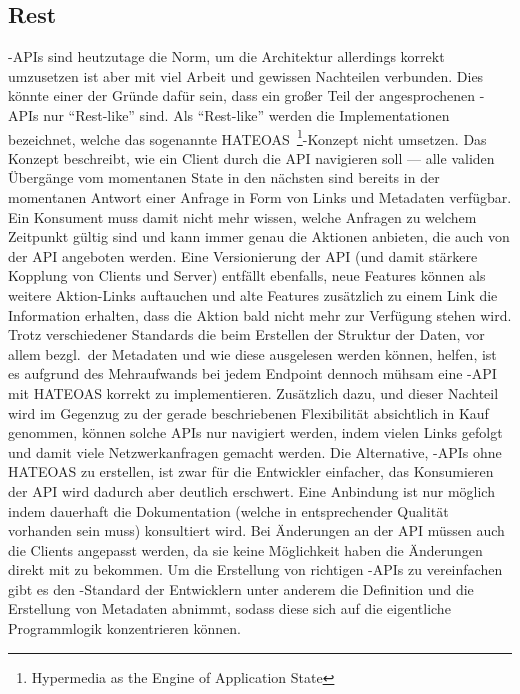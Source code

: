\subsection{Rest}
-APIs sind heutzutage die Norm, um die Architektur allerdings korrekt umzusetzen ist aber mit viel Arbeit und gewissen Nachteilen verbunden. Dies könnte einer der Gründe dafür sein, dass ein großer Teil der angesprochenen -APIs nur ``Rest-like'' sind. Als ``Rest-like'' werden die Implementationen bezeichnet, welche das sogenannte HATEOAS~\footnote{Hypermedia as the Engine of Application State}-Konzept nicht umsetzen. Das Konzept beschreibt, wie ein Client durch die API navigieren soll --- alle validen Übergänge vom momentanen State in den nächsten sind bereits in der momentanen Antwort einer Anfrage in Form von Links und Metadaten verfügbar. Ein Konsument muss damit nicht mehr wissen, welche Anfragen zu welchem Zeitpunkt gültig sind und kann immer genau die Aktionen anbieten, die auch von der API angeboten werden. Eine Versionierung der API (und damit stärkere Kopplung von Clients und Server) entfällt ebenfalls, neue Features können als weitere Aktion-Links auftauchen und alte Features zusätzlich zu einem Link die Information erhalten, dass die Aktion bald nicht mehr zur Verfügung stehen wird. Trotz verschiedener Standards die beim Erstellen der Struktur der Daten, vor allem bezgl.\ der Metadaten und wie diese ausgelesen werden können, helfen, ist es aufgrund des Mehraufwands bei jedem Endpoint dennoch mühsam eine -API mit HATEOAS korrekt zu implementieren. Zusätzlich dazu, und dieser Nachteil wird im Gegenzug zu der gerade beschriebenen Flexibilität absichtlich in Kauf genommen, können solche APIs nur navigiert werden, indem vielen Links gefolgt und damit viele Netzwerkanfragen gemacht werden. 
Die Alternative, -APIs ohne HATEOAS zu erstellen, ist zwar für die Entwickler einfacher, das Konsumieren der API wird dadurch aber deutlich erschwert. Eine Anbindung ist nur möglich indem dauerhaft die Dokumentation (welche in entsprechender Qualität vorhanden sein muss) konsultiert wird. Bei Änderungen an der API müssen auch die Clients angepasst werden, da sie keine Möglichkeit haben die Änderungen direkt mit zu bekommen.
Um die Erstellung von richtigen -APIs zu vereinfachen gibt es den -Standard der Entwicklern unter anderem die Definition und die Erstellung von Metadaten abnimmt, sodass diese sich auf die eigentliche Programmlogik konzentrieren können.
